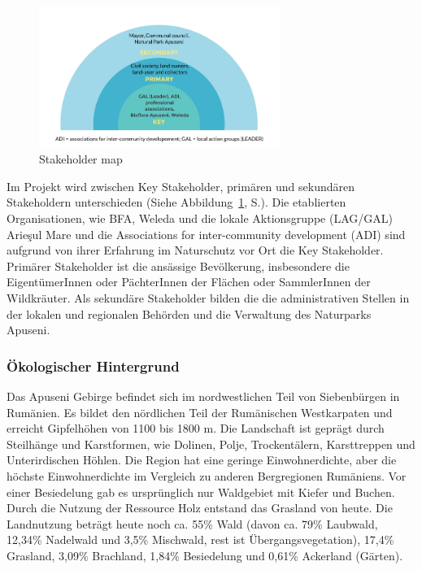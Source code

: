 \begin{figure}[htb]
 \centering
 \includegraphics[width=0.7\textwidth,angle=0]{abb/Stakeholder-map}
 \caption{Stakeholder map \citep[nach][]{DBU2018}}
\label{fig:stakeholdermap}
\end{figure}

Im Projekt wird zwischen Key Stakeholder, primären und sekundären Stakeholdern unterschieden (Siehe Abbildung~\ref{fig:stakeholdermap}, S.\pageref{fig:stakeholdermap}). Die etablierten Organisationen, wie BFA, Weleda und die lokale Aktionsgruppe (LAG/GAL) Arieşul Mare und die Associations for inter-community development (ADI) sind aufgrund von ihrer Erfahrung im Naturschutz vor Ort die Key Stakeholder. Primärer Stakeholder ist die ansässige Bevölkerung, insbesondere die EigentümerInnen oder PächterInnen der Flächen oder SammlerInnen der Wildkräuter. Als sekundäre Stakeholder bilden die die administrativen Stellen in der lokalen und regionalen Behörden und die Verwaltung des Naturparks Apuseni.

\subsubsection{Ökologischer Hintergrund}

Das Apuseni Gebirge befindet sich im nordwestlichen Teil von Siebenbürgen in Rumänien. Es bildet den nördlichen Teil der Rumänischen Westkarpaten und erreicht Gipfelhöhen von 1100 bis 1800 m. Die Landschaft ist geprägt durch Steilhänge und Karstformen, wie Dolinen, Polje, Trockentälern, Karsttreppen und Unterirdischen Höhlen. Die Region hat eine geringe Einwohnerdichte, aber die höchste Einwohnerdichte im Vergleich zu anderen Bergregionen Rumäniens. Vor einer Besiedelung gab es ursprünglich nur Waldgebiet mit Kiefer und Buchen. Durch die Nutzung der Ressource Holz entstand das Grasland von heute. Die Landnutzung beträgt heute noch ca. 55\% Wald (davon ca. 79\% Laubwald, 12,34\% Nadelwald und 3,5\% Mischwald, rest ist Übergangsvegetation), 17,4\% Grasland, 3,09\% Brachland, 1,84\% Besiedelung und 0,61\% Ackerland (Gärten).

